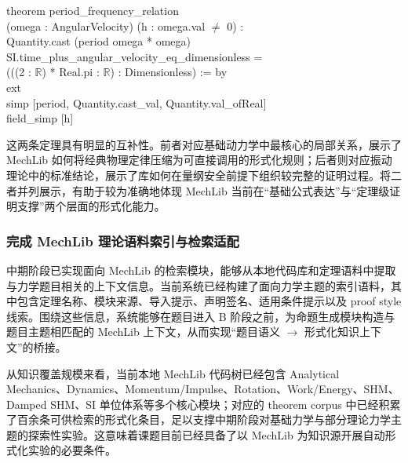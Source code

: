 \documentclass[12pt,a4paper]{ctexart}
\begin{document}
\begin{codeblock}
\small\ttfamily
theorem period\_frequency\_relation\\
\hspace*{1em}(omega : AngularVelocity) (h : omega.val $\neq$ 0) :\\
\hspace*{1em}Quantity.cast (period omega * omega)\\
\hspace*{2em}SI.time\_plus\_angular\_velocity\_eq\_dimensionless =\\
\hspace*{2em}(((2 : $\mathbb{R}$) * Real.pi : $\mathbb{R}$) : Dimensionless) := by\\
\hspace*{1em}ext\\
\hspace*{1em}simp [period, Quantity.cast\_val, Quantity.val\_ofReal]\\
\hspace*{1em}field\_simp [h]
\end{codeblock}

这两条定理具有明显的互补性。前者对应基础动力学中最核心的局部关系，展示了 MechLib 如何将经典物理定律压缩为可直接调用的形式化规则；后者则对应振动理论中的标准结论，展示了库如何在量纲安全前提下组织较完整的证明过程。将二者并列展示，有助于较为准确地体现 MechLib 当前在“基础公式表达”与“定理级证明支撑”两个层面的形式化能力。

\subsubsection{完成 MechLib 理论语料索引与检索适配}

中期阶段已实现面向 MechLib 的检索模块，能够从本地代码库和定理语料中提取与力学题目相关的上下文信息。当前系统已经构建了面向力学主题的索引语料，其中包含定理名称、模块来源、导入提示、声明签名、适用条件提示以及 proof style 线索。围绕这些信息，系统能够在题目进入 B 阶段之前，为命题生成模块构造与题目主题相匹配的 MechLib 上下文，从而实现“题目语义 $\rightarrow$ 形式化知识上下文”的桥接。

从知识覆盖规模来看，当前本地 MechLib 代码树已经包含 Analytical Mechanics、Dynamics、Momentum/Impulse、Rotation、Work/Energy、SHM、Damped SHM、SI 单位体系等多个核心模块；对应的 theorem corpus 中已经积累了百余条可供检索的形式化条目，足以支撑中期阶段对基础力学与部分理论力学主题的探索性实验。这意味着课题目前已经具备了以 MechLib 为知识源开展自动形式化实验的必要条件。
\end{document}
